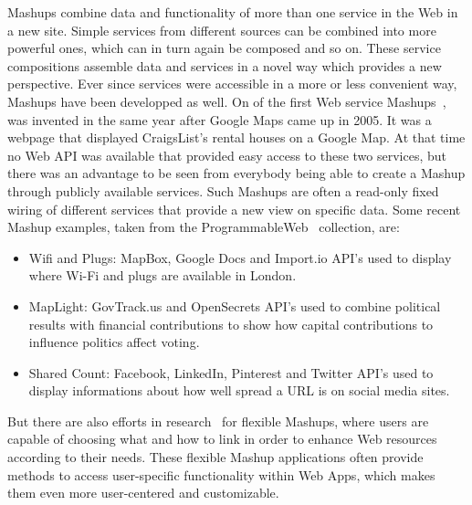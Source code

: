 \textrm{Mashups} combine data and functionality of more than one service in the Web in a new site.
Simple services from different sources can be combined into more powerful ones, which can in turn again be composed and so on.
These service compositions assemble data and services in a novel way which provides a new perspective.
Ever since services were accessible in a more or less convenient way, \textrm{Mashups} have been developped as well.
On of the first Web service \textrm{Mashups}~\cite{wwwHosuingMaps}, was invented in the same year after Google Maps came up in 2005.
It was a webpage that displayed CraigsList's rental houses on a Google Map.
At that time no \textrm{Web API} was available that provided easy access to these two services, but there was an advantage to be seen from everybody being able to create a \textrm{Mashup} through publicly available services.
Such \textrm{Mashups} are often a read-only fixed wiring of different services that provide a new view on specific data.
Some recent \textrm{Mashup} examples, taken from the \textrm{ProgrammableWeb}~\cite{wwwProgrammableWeb} collection, are:

\begin{itemize}
  \item \textrm{Wifi and Plugs}: MapBox, Google Docs and Import.io API's used to display where Wi-Fi and plugs are available in London.
  \item \textrm{MapLight}: GovTrack.us and OpenSecrets API's used to combine political results with financial contributions to show how capital contributions to influence politics affect voting.
  \item \textrm{Shared Count}: Facebook, LinkedIn, Pinterest and Twitter API's used to display informations about how well spread a URL is on social media sites.
\end{itemize}

But there are also efforts in research~\cite{10.1007/978-3-642-22233-7_11}\cite{4278815}\cite{Rizzotti:2010:UST:1772690.1772861}\cite{Stolee20131289} for flexible \textrm{Mashups}, where users are capable of choosing what and how to link in order to enhance Web resources according to their needs.
These flexible \textrm{Mashup} applications often provide methods to access user-specific functionality within \textrm{Web Apps}, which makes them even more user-centered and customizable.


